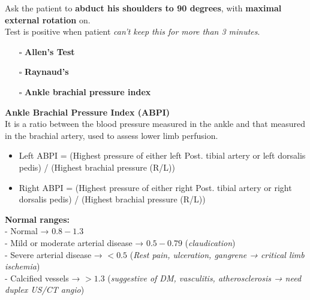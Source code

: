 \documentclass[
  13.5pt,
  a4paper,
  DIV=11,
  numbers=noendperiod]{scrreprt}
\providecommand{\tightlist}{%
  \setlength{\itemsep}{0pt}\setlength{\parskip}{0pt}}
\begin{document}
Ask the patient to \textbf{abduct his shoulders to 90 degrees}, with
\textbf{maximal external rotation} on.\\
Test is positive when patient \emph{can't keep this for more than 3
minutes}.

\begin{itemize}
\tightlist
\item[$\square$]
  \textbf{Allen's Test}\\
\item[$\square$]
  \textbf{Raynaud's}\\
\item[$\square$]
  \textbf{Ankle brachial pressure index}
\end{itemize}

\begin{tcolorbox}[enhanced jigsaw, left=2mm, toptitle=1mm, breakable, title=\textcolor{quarto-callout-note-color}{\faInfo}\hspace{0.5em}{Note}, coltitle=black, opacitybacktitle=0.6, arc=.35mm, colback=white, leftrule=.75mm, toprule=.15mm, bottomtitle=1mm, titlerule=0mm, rightrule=.15mm, colbacktitle=quarto-callout-note-color!10!white, bottomrule=.15mm, opacityback=0, colframe=quarto-callout-note-color-frame]

\textbf{Ankle Brachial Pressure Index (ABPI)}\\
It is a ratio between the blood pressure measured in the ankle and that
measured in the brachial artery, used to assess lower limb perfusion.

\begin{itemize}
\tightlist
\item
  Left ABPI = (Highest pressure of either left Post. tibial artery or
  left dorsalis pedis) / (Highest brachial pressure (R/L))\\
\item
  Right ABPI = (Highest pressure of either right Post. tibial artery or
  right dorsalis pedis) / (Highest brachial pressure (R/L))
\end{itemize}

\textbf{Normal ranges:}\\
- Normal → \(0.8 - 1.3\)\\
- Mild or moderate arterial disease → \(0.5 - 0.79\)
(\emph{claudication})\\
- Severe arterial disease → \(<0.5\) (\emph{Rest pain, ulceration,
gangrene → critical limb ischemia})\\
- Calcified vessels → \(>1.3\) (\emph{suggestive of DM, vasculitis,
atherosclerosis → need duplex US/CT angio})

\end{tcolorbox}
\end{document}
